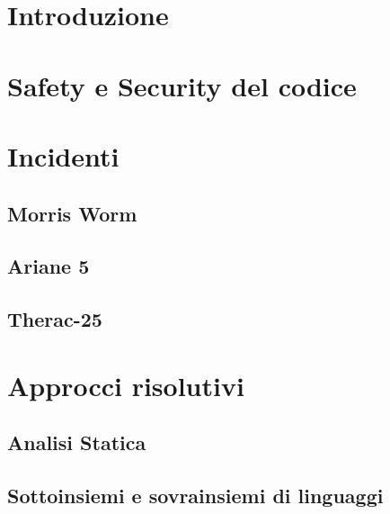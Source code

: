 \documentclass{acm_proc_article-sp}
\begin{document}
\section{Introduzione}


\section{Safety e Security del codice}


\section{Incidenti}

\subsection{Morris Worm}

\subsection{Ariane 5}

\subsection{Therac-25}




\section{Approcci risolutivi}

\subsection{Analisi Statica}

\subsection{Sottoinsiemi e sovrainsiemi di linguaggi} %

\end{document}
